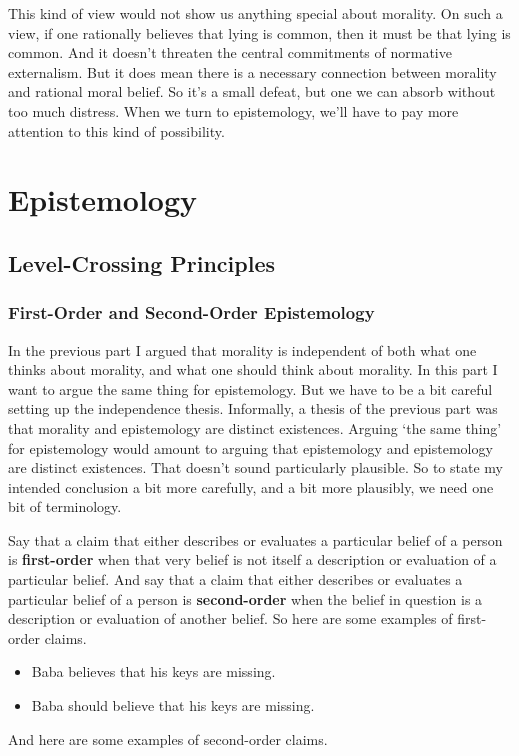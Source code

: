 This kind of view would not show us anything special about morality. On such a view, if one rationally believes that lying is common, then it must be that lying is common. And it doesn't threaten the central commitments of normative externalism. But it does mean there is a necessary connection between morality and rational moral belief. So it's a small defeat, but one we can absorb without too much distress. When we turn to epistemology, we'll have to pay more attention to this kind of possibility.

\part{Epistemology}
\label{epistemology}

\chapter{Level-Crossing Principles}
\label{level-crossingprinciples}

\section{First-Order and Second-Order Epistemology}
\label{first-orderandsecond-orderepistemology}

In the previous part I argued that morality is independent of both what one thinks about morality, and what one should think about morality. In this part I want to argue the same thing for epistemology. But we have to be a bit careful setting up the independence thesis. Informally, a thesis of the previous part was that morality and epistemology are distinct existences. Arguing `the same thing' for epistemology would amount to arguing that epistemology and epistemology are distinct existences. That doesn't sound particularly plausible. So to state my intended conclusion a bit more carefully, and a bit more plausibly, we need one bit of terminology.

Say that a claim that either describes or evaluates a particular belief of a person is \textbf{first-order} when that very belief is not itself a description or evaluation of a particular belief. And say that a claim that either describes or evaluates a particular belief of a person is \textbf{second-order} when the belief in question is a description or evaluation of another belief. So here are some examples of first-order claims.

\begin{itemize}
\item{} \gls{Baba} believes that his keys are missing.

\item{} \gls{Baba} should believe that his keys are missing.

\end{itemize}
And here are some examples of second-order claims.

